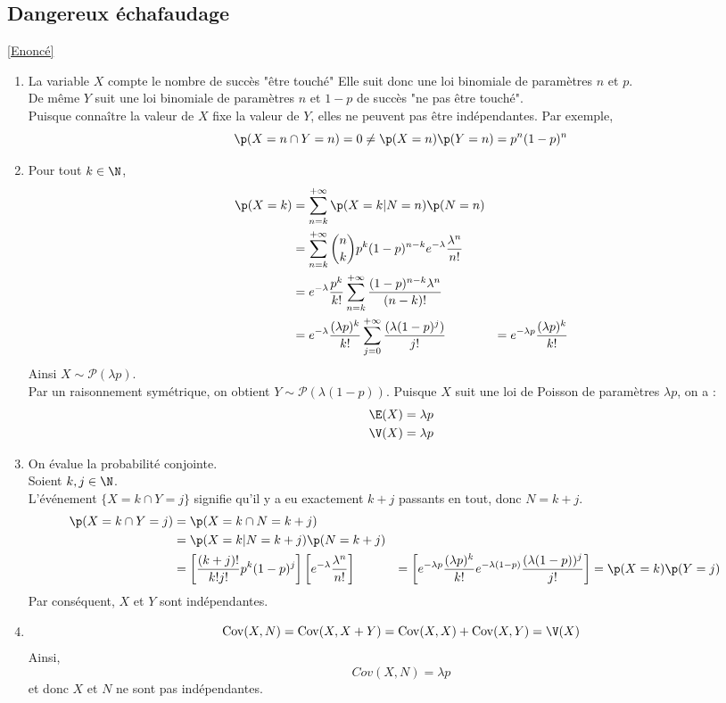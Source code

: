 \documentclass[8pt]{book}
\begin{document}
	\subsection{Dangereux échafaudage }
	\label{Dangereux échafaudage corrigé}
	\textcolor{blue}{\hyperref[Dangereux échafaudage]{[Enoncé]}}\\
	\begin{enumerate}
		\item La variable $X$ compte le nombre de succès "être touché" Elle suit donc une loi binomiale de paramètres $n$ et $p$.\\
		De même $Y$ suit une loi binomiale de paramètres $n$ et $1-p$ de succès "ne pas être touché".\\
		Puisque connaître la valeur de $X$ fixe la valeur de $Y$, elles ne peuvent pas être indépendantes.
		Par exemple, \[\p(X=n\cap Y=n)=0\ne \p(X=n)\p(Y=n)=p^n(1-p)^n\]
		\item Pour tout $k\in\N$,
		\begin{align*}
			\p(X=k)&=\sum_{n=k}^{+\infty}\p(X=k|N=n)\p(N=n)\\
			&=\sum_{n=k}^{+\infty}\binom{n}{k}p^k(1-p)^{n-k}e^{-\lambda}\frac{\lambda^n}{n!}\\
			&=e^{-\lambda}\frac{p^k}{k!}\sum_{n=k}^{+\infty}\frac{(1-p)^{n-k}\lambda^n}{(n-k)!}\\
			&=e^{-\lambda}\frac{(\lambda p)^k}{k!}\sum_{j=0}^{+\infty}\frac{(\lambda(1-p)^j)}{j!}
			&=e^{-\lambda p}\frac{(\lambda p)^k}{k!}
		\end{align*}
		Ainsi $X\sim \mathcal{P}(\lambda p)$.\\
		Par un raisonnement symétrique, on obtient $Y\sim \mathcal{P}(\lambda(1-p))$.
		Puisque $X$ suit une loi de Poisson de paramètres $\lambda p$, on a :
		\begin{align*}
			\E(X)=\lambda p\\
			\V(X)=\lambda p
		\end{align*}
		\item On évalue la probabilité conjointe.\\
		Soient $k,j\in\N$.\\
		L'événement $\{X=k\cap Y=j\}$ signifie qu'il y a eu exactement $k+j$ passants en tout, donc $N=k+j$.\\
		\begin{align*}
			\p(X=k\cap Y=j)&=\p(X=k\cap N=k+j)\\
			&=\p(X=k|N=k+j)\p(N=k+j)\\
			&=\left[\frac{(k+j)!}{k!j!}p^k(1-p)^j\right]\left[e^{-\lambda}\frac{\lambda^n}{n!}\right]
			&=\left[e^{-\lambda p}\frac{(\lambda p)^k}{k!}{e^{-\lambda(1-p)}\frac{(\lambda(1-p))^j}{j!}}\right]
			&=\p(X=k)\p(Y=j)
		\end{align*}
		Par conséquent, $X$ et $Y$ sont indépendantes.
		\item \[\operatorname{Cov}(X,N)=\operatorname{Cov}(X,X+Y)=\operatorname{Cov}(X,X)+\operatorname{Cov}(X,Y)=\V(X)\]
		Ainsi, \[Cov(X,N)=\lambda p\]
		et donc $X$ et $N$ ne sont pas indépendantes.
	\end{enumerate}
\end{document}
